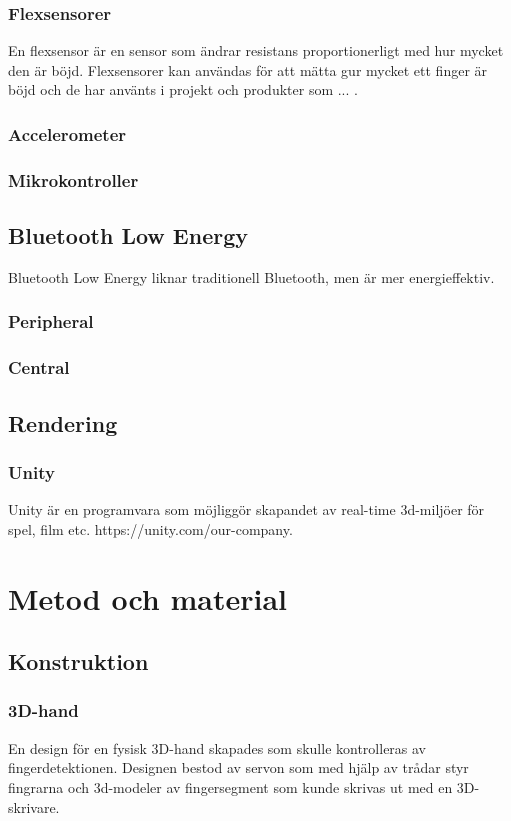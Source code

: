 \documentclass[a4paper]{article}
\begin{document}
\begin{sloppypar}
    \subsubsection{Flexsensorer}
    En flexsensor är en sensor som ändrar resistans proportionerligt med hur mycket den är böjd.
    Flexsensorer kan användas för att mätta gur mycket ett finger är böjd och de har använts i projekt och produkter som ... .
    \subsubsection{Accelerometer}
    \subsubsection{Mikrokontroller}

    \subsection{Bluetooth Low Energy}
    Bluetooth Low Energy liknar traditionell Bluetooth, men är mer energieffektiv.
    \subsubsection{Peripheral}
    \subsubsection{Central}

    \subsection{Rendering}
    \subsubsection{Unity}
    Unity är en programvara som möjliggör skapandet av real-time 3d-miljöer för spel, film etc. https://unity.com/our-company.

    \section{Metod och material}



    \subsection{Konstruktion}

    \subsubsection{3D-hand}
    En design för en fysisk 3D-hand skapades som skulle kontrolleras av fingerdetektionen.
    Designen bestod av servon som med hjälp av trådar styr fingrarna
    och 3d-modeler av fingersegment som kunde skrivas ut med en 3D-skrivare.


\end{sloppypar}
\end{document}
